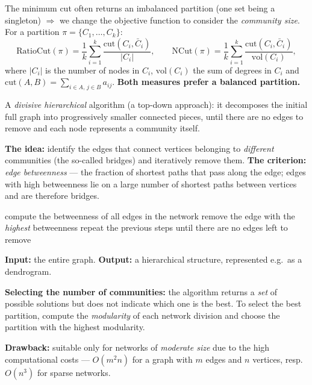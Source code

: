 \documentclass[11pt,a4paper]{article}
\theoremstyle{definition}
\begin{document}
\begin{defbox}
The minimum cut often returns an imbalanced partition (one set being a singleton) $\Rightarrow$ we
change the objective function to consider the \emph{community size}. For a partition
$\pi=\{C_1,\dots,C_k\}$:
\[ \mathrm{RatioCut}(\pi)=\frac{1}{k}\sum_{i=1}^{k}\frac{\mathrm{cut}(C_i,\bar C_i)}{|C_i|},\qquad
   \mathrm{NCut}(\pi)=\frac{1}{k}\sum_{i=1}^{k}\frac{\mathrm{cut}(C_i,\bar C_i)}{\mathrm{vol}(C_i)}, \]
where $|C_i|$ is the number of nodes in $C_i$, $\mathrm{vol}(C_i)$ the sum of degrees in $C_i$ and
$\mathrm{cut}(A,B)=\sum_{i\in A,\,j\in B}a_{ij}$. \textbf{Both measures prefer a balanced partition.}
\end{defbox}

\begin{defbox}
A \emph{divisive hierarchical} algorithm (a top-down approach): it decomposes the initial full graph
into progressively smaller connected pieces, until there are no edges to remove and each node
represents a community itself.

\textbf{The idea:} identify the edges that connect vertices belonging to \emph{different} communities
(the so-called bridges) and iteratively remove them. \textbf{The criterion:} \emph{edge betweenness}
--- the fraction of shortest paths that pass along the edge; edges with high betweenness lie on a
large number of shortest paths between vertices and are therefore bridges.

\begin{algorithmic}[1]
\State compute the betweenness of all edges in the network
\State remove the edge with the \emph{highest} betweenness
\State repeat the previous steps until there are no edges left to remove
\end{algorithmic}
\textbf{Input:} the entire graph. \textbf{Output:} a hierarchical structure, represented e.g.\ as a
dendrogram.

\textbf{Selecting the number of communities:} the algorithm returns a \emph{set} of possible
solutions but does not indicate which one is the best. To select the best partition, compute the
\emph{modularity} of each network division and choose the partition with the highest modularity.

\textbf{Drawback:} suitable only for networks of \emph{moderate size} due to the high computational
costs --- $O(m^2n)$ for a graph with $m$ edges and $n$ vertices, resp.\ $O(n^3)$ for sparse networks.
\end{defbox}
\end{document}

